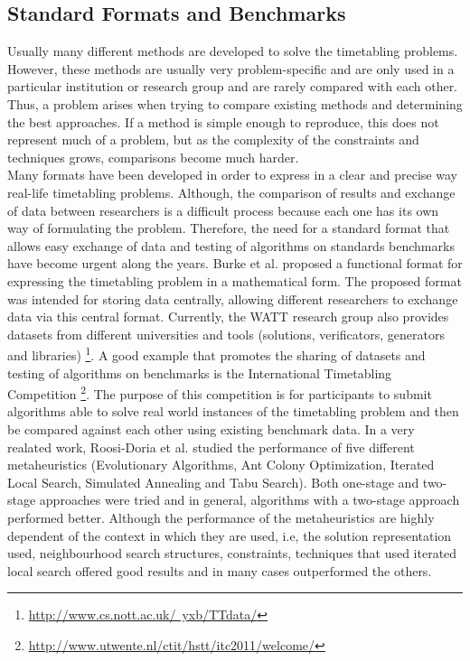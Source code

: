 \subsection{Standard Formats and Benchmarks}

Usually many different methods are developed to solve the timetabling problems. However, these methods are usually very problem-specific and are only used in a particular institution or research group and are rarely compared with each other. Thus, a problem arises when trying to compare existing methods and determining the best approaches. If a method is simple enough to reproduce, this does not represent much of a problem, but as the complexity of the constraints and techniques grows, comparisons become much harder.\\
Many formats have been developed in order to express in a clear and precise way real-life timetabling problems. Although, the comparison of results and exchange of data between researchers is a difficult process because each one has its own way of formulating the problem. Therefore, the need for a standard format that allows easy exchange of data and testing of algorithms on standards benchmarks have become urgent along the years. Burke et al. \citep{burke1998standard} proposed a functional format for expressing the timetabling problem in a mathematical form. The proposed format was intended for storing data centrally, allowing different researchers to exchange data via this central format.
Currently, the WATT research group also provides datasets from different universities and tools (solutions, verificators, generators and libraries) \footnote{\href{http://www.cs.nott.ac.uk/~yxb/TTdata/}{http://www.cs.nott.ac.uk/~yxb/TTdata/}}.
A good example that promotes the sharing of datasets and testing of algorithms on benchmarks is the International Timetabling Competition \footnote{\href{http://www.utwente.nl/ctit/hstt/itc2011/welcome/}{http://www.utwente.nl/ctit/hstt/itc2011/welcome/}}. The purpose of this competition is for participants to submit algorithms able to solve real world instances of the timetabling problem and then be compared against each other using existing benchmark data. In a very realated work, Roosi-Doria et al. \citep{rossi2003comparison} studied the performance of five different metaheuristics (Evolutionary Algorithms, Ant Colony Optimization, Iterated Local Search, Simulated Annealing and Tabu Search). Both one-stage and two-stage approaches were tried and in general, algorithms with a two-stage approach performed better. Although the performance of the metaheuristics are highly dependent of the context in which they are used, i.e, the solution representation used, neighbourhood search structures, constraints, techniques that used iterated local search offered good results and in many cases outperformed the others.

